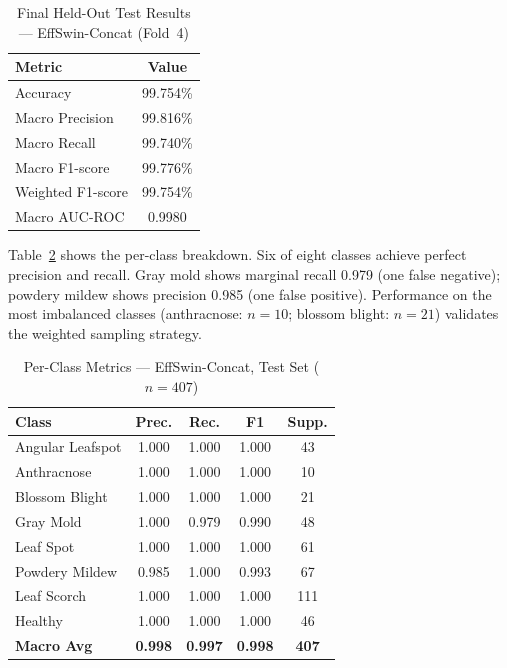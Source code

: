 \documentclass[conference]{IEEEtran}
\begin{document}
\begin{table}[htbp]
\caption{Final Held-Out Test Results --- EffSwin-Concat (Fold~4)}
\begin{center}
\begin{tabular}{lc}
\toprule
\textbf{Metric} & \textbf{Value} \\
\midrule
Accuracy          & 99.754\% \\
Macro Precision   & 99.816\% \\
Macro Recall      & 99.740\% \\
Macro F1-score    & 99.776\% \\
Weighted F1-score & 99.754\% \\
Macro AUC-ROC     & 0.9980   \\
\bottomrule
\end{tabular}
\label{tab:test}
\end{center}
\end{table}

Table~\ref{tab:perclass} shows the per-class breakdown. Six of eight classes achieve perfect precision and recall. Gray mold shows marginal recall 0.979 (one false negative); powdery mildew shows precision 0.985 (one false positive). Performance on the most imbalanced classes (anthracnose: $n{=}10$; blossom blight: $n{=}21$) validates the weighted sampling strategy.

\begin{table}[htbp]
\caption{Per-Class Metrics --- EffSwin-Concat, Test Set ($n{=}407$)}
\begin{center}
\begin{tabular}{lcccc}
\toprule
\textbf{Class} & \textbf{Prec.} & \textbf{Rec.} & \textbf{F1} & \textbf{Supp.} \\
\midrule
Angular Leafspot & 1.000 & 1.000 & 1.000 &  43 \\
Anthracnose      & 1.000 & 1.000 & 1.000 &  10 \\
Blossom Blight   & 1.000 & 1.000 & 1.000 &  21 \\
Gray Mold        & 1.000 & 0.979 & 0.990 &  48 \\
Leaf Spot        & 1.000 & 1.000 & 1.000 &  61 \\
Powdery Mildew   & 0.985 & 1.000 & 0.993 &  67 \\
Leaf Scorch      & 1.000 & 1.000 & 1.000 & 111 \\
Healthy          & 1.000 & 1.000 & 1.000 &  46 \\
\midrule
\textbf{Macro Avg} & \textbf{0.998} & \textbf{0.997} & \textbf{0.998} & \textbf{407} \\
\bottomrule
\end{tabular}
\label{tab:perclass}
\end{center}
\end{table}
\end{document}
